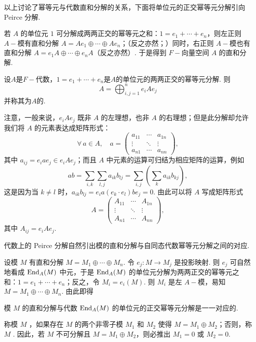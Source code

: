 以上讨论了幂等元与代数直和分解的关系，下面将单位元的正交幂等元分解引向 Peirce 分解.

若 $A$ 的单位元 $1$ 可分解成两两正交的幂等元之和：$1=e_1+\cdots+e_n$，则左正则 $A-\!\!$模有直和分解 $A=Ae_1\oplus\cdots\oplus Ae_n$；（反之亦然；）同时，右正则 $A-\!\!$模也有直和分解 $A=e_1A\oplus\cdots\oplus e_nA$（反之亦然）. 于是得到 $F-\!\!$向量空间 $A$ 的直和分解.
\begin{definition}[Pierce分解]
    设$A$是$F-\!\!$代数，$1=e_1+\cdots+e_n$是$A$的单位元的两两正交的幂等元分解. 则
    \begin{equation*}
        A = \bigoplus_{i,j=1}^n e_i A e_j
    \end{equation*}
    并称其为$A$的.
\end{definition}

注意，一般来说，$e_iAe_j$ 既非 $A$ 的左理想，也非 $A$ 的右理想；但是此分解却允许我们将 $A$ 的元素表达成矩阵形式：
\[
\forall\, a\in A, \quad a=\begin{pmatrix} a_{11} & \cdots & a_{1n} \\ \vdots & \ddots & \vdots \\ a_{n1} & \cdots & a_{nn} \end{pmatrix},
\]
其中 $a_{ij}=e_iae_j\in e_iAe_j$；而且 $A$ 中元素的运算可归结为相应矩阵的运算，例如
\[
ab=\sum_{i,k}\sum_{l,j} a_{ik}b_{lj} = \sum_{i,j}\left(\sum_k a_{ik}b_{kj}\right),
\]
这是因为当 $k\ne l$ 时，$a_{ik}b_{lj}=e_ia(e_k\cdot e_l)be_j=0$. 由此可以将 $A$ 写成矩阵形式
\[
A=\begin{pmatrix} A_{11} & \cdots & A_{1n} \\ \vdots & \ddots & \vdots \\ A_{n1} & \cdots & A_{nn} \end{pmatrix},
\]
其中 $A_{ij}=e_iAe_j$.

代数上的 Peirce 分解自然引出模的直和分解与自同态代数幂等元分解之间的对应.

设模 $M$ 有直和分解 $M=M_1\oplus\cdots\oplus M_n$. 令 $e_j: M\longrightarrow M_j$ 是投影映射. 则 $e_j$ 可自然地看成 $\operatorname{End}_A(M)$ 中元，于是 $\operatorname{End}_A(M)$ 的单位元分解为两两正交的幂等元之和：$1=e_1+\cdots+e_n$；反之，令 $M_i=e_i(M)$. 则 $M_i$ 是左 $A-\!\!$模，易知 $M=M_1\oplus\cdots\oplus M_n$. 由此即得

\begin{proposition}[]
    模 $M$ 的直和分解与代数 $\operatorname{End}_A(M)$ 的单位元的正交幂等元分解是一一对应的.
\end{proposition}

称模 $M$ ，如果存在 $M$ 的两个非零子模 $M_1$ 和 $M_2$ 使得 $M=M_1\oplus M_2$；否则，称 $M$ . 因此，若 $M$ 不可分解且 $M=M_1\oplus M_2$，则必推出 $M_1=0$ 或 $M_2=0$.

